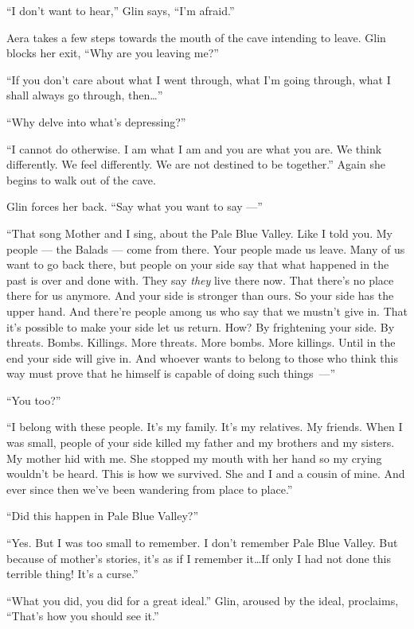 \documentclass[twoside,11pt,openany]{book}
\begin{document}
``I don't want to hear,'' Glin says, ``I'm afraid.''

Aera takes a few steps towards the mouth{ }of the cave intending to leave. Glin blocks her exit,
``Why are you leaving me?''

``If you don't care about what I went through, what I'm going through, what I shall always go through, then{\ldots}''

``Why delve into what's depressing?''

``I cannot do otherwise. I am what I am and you are what you are. We think differently. We feel differently.
We are not destined to be together.'' Again she begins to walk out of the cave.

Glin forces her back. ``Say what you want to say ---''

``That song Mother and I sing, about the Pale Blue Valley. Like I told you. My people --- the Balads --- come
from there. Your people made us leave. Many of us want to go back there, but people on your side say that what happened
in the past is over and done with.  They say \textit{they }live there now. That there's no place there for us anymore.
And your side is stronger than ours. So your side has the upper hand. And there're people among us who say that we
mustn't give in. That it's possible to make your side let us return. How? By frightening your side. By threats. Bombs.
Killings. More threats. More bombs. More killings. Until in the end your side will give in. And whoever wants to belong
to those who think this way must prove that he himself is capable
of doing such things~---''

``You too?''

``I belong with these people. It's my family. It's my relatives. My friends. When I was small, people of
your side killed my father and my brothers and my sisters. My mother hid with me. She stopped my mouth with her hand so
my crying wouldn't be heard. This is how we survived. She and I and a cousin of mine. And ever since then we've been
wandering from place to place.''

``Did this happen in Pale Blue Valley?''

``Yes. But I was too small to remember. I don't remember Pale Blue Valley.  But because of mother's
stories, it's as if I remember it{\ldots}If only I had not done this terrible thing! It's a curse.''

``What you did, you did for a great ideal.'' Glin, aroused by{ }the ideal, proclaims,
``That's how you should see it.''
\end{document}
